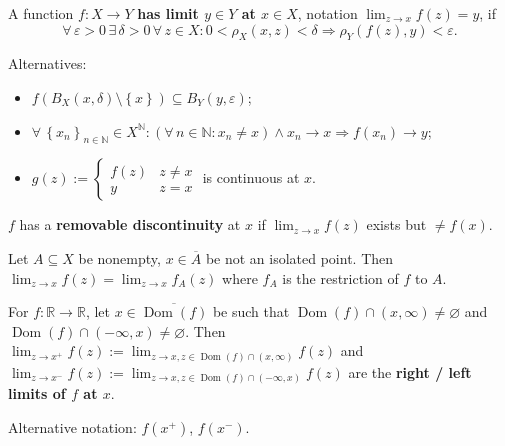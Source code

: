 \documentclass{notes}
\begin{document}
  \begin{defn}
    A function $f \colon X \to Y$ {\boldmath \bfseries has limit $y \in Y$ at $x \in X$}, notation $\lim_{z \to x} f(z) = y$, if 
    \[
      \forall \, \varepsilon > 0 \, \exists \, \delta > 0 \, \forall \, z \in X: 0 < \rho_X(x, z) < \delta \Rightarrow \rho_Y(f(z), y) < \varepsilon.
    \]
    
    Alternatives: 
    \begin{itemize}
      \item $f(B_X(x, \delta) \setminus \left \{ x \right \}) \subseteq B_Y(y, \varepsilon)$; 

      \item $\forall \, \left \{ x_n \right \}_{n \in \mathbb N} \in X^\mathbb N: (\forall \, n \in \mathbb N: x_n \neq x) \land x_n \to x \Rightarrow f(x_n) \to y$; 
        
      \item $g(z) := \begin{cases}
        f(z) & z \neq x \\ 
        y & z = x
      \end{cases}$ is continuous at $x$.
    \end{itemize}
  \end{defn}
  
  \newpage

  \begin{defn}
    $f$ has a {\boldmath \bfseries removable discontinuity} at $x$ if $\lim_{z \to x} f(z)$ exists but $\neq f(x)$.
  \end{defn}
  
  \begin{defn}
    Let $A \subseteq X$ be nonempty, $x \in \overline A$ be not an isolated point.
    Then $\lim_{z \to x} f(z) = \lim_{z \to x} f_A(z)$ where $f_A$ is the restriction of $f$ to $A$.
  \end{defn}
  
  \begin{defn}
    For $f \colon \mathbb R \to \mathbb R$, let $x \in \overline{\operatorname{Dom}(f)}$ be such that $\operatorname{Dom}(f) \cap (x, \infty) \neq \varnothing$ and $\operatorname{Dom}(f) \cap (-\infty, x) \neq \varnothing$.
    Then $\lim_{z \to x^+} f(z) := \lim_{z \to x, z \in \operatorname{Dom}(f) \cap (x, \infty)} f(z)$ and $\lim_{z \to x^-} f(z) := \lim_{z \to x, z \in \operatorname{Dom}(f) \cap (-\infty, x)} f(z)$ are the {\boldmath \bfseries right / left limits of $f$ at $x$}.

    Alternative notation: $f(x^+)$, $f(x^-)$.
  \end{defn}
  
\end{document}
